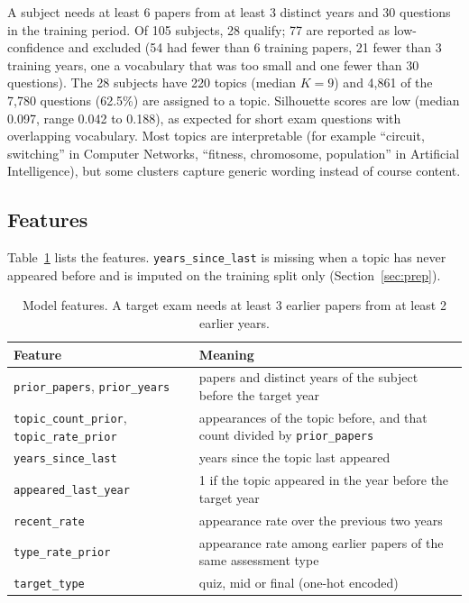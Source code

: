 \documentclass[11pt,a4paper]{article}
\newcommand{\trp}{\texttt{topic\_rate\_prior}}
\begin{document}
A subject needs at least 6 papers from at least 3 distinct years and 30 questions in the training period. Of 105
subjects, 28 qualify; 77 are reported as low-confidence and excluded (54 had fewer than 6 training papers, 21 fewer
than 3 training years, one a vocabulary that was too small and one fewer than 30 questions). The 28 subjects have 220
topics (median $K=9$) and 4{,}861 of the 7{,}780 questions (62.5\%) are assigned to a topic. Silhouette scores are low
(median 0.097, range 0.042 to 0.188), as expected for short exam questions with overlapping vocabulary. Most topics
are interpretable (for example ``circuit, switching'' in Computer Networks, ``fitness, chromosome, population'' in
Artificial Intelligence), but some clusters capture generic wording instead of course content.

\subsection{Features}
Table~\ref{tab:features} lists the features. \texttt{years\_since\_last} is missing when a topic has never appeared
before and is imputed on the training split only (Section~\ref{sec:prep}).

\begin{table}[!htb]
\centering
\small
\begin{tabular}{lp{9.0cm}}
\toprule
Feature & Meaning \\
\midrule
\texttt{prior\_papers}, \texttt{prior\_years} & papers and distinct years of the subject before the target year \\
\texttt{topic\_count\_prior}, \trp & appearances of the topic before, and that count divided by \texttt{prior\_papers} \\
\texttt{years\_since\_last} & years since the topic last appeared \\
\texttt{appeared\_last\_year} & 1 if the topic appeared in the year before the target year \\
\texttt{recent\_rate} & appearance rate over the previous two years \\
\texttt{type\_rate\_prior} & appearance rate among earlier papers of the same assessment type \\
\texttt{target\_type} & quiz, mid or final (one-hot encoded) \\
\bottomrule
\end{tabular}
\caption{Model features. A target exam needs at least 3 earlier papers from at least 2 earlier years.}
\label{tab:features}
\end{table}
\end{document}
